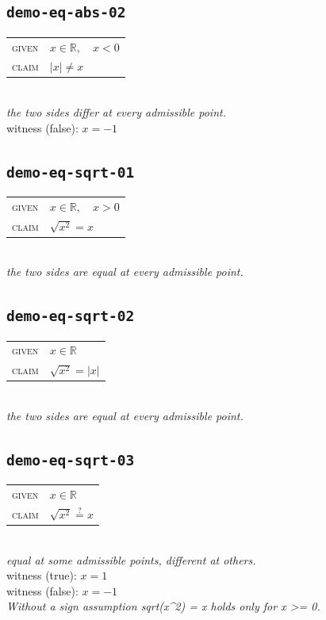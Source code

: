 \documentclass[11pt]{article}
\begin{document}
\subsection*{\texttt{demo-eq-abs-02}}
\begin{tabular}{@{}l@{\quad}l@{}}
\textsc{given} & $x \in \mathbb{R},\quad x < 0$ \\[4pt]
\textsc{claim} & $\displaystyle \left|x\right| \neq x$ \\
\end{tabular}\\[2pt]
{\small\emph{the two sides differ at every admissible point.}}\\
{\footnotesize\color{gray}witness (false): $x = -1$}\\

\subsection*{\texttt{demo-eq-sqrt-01}}
\begin{tabular}{@{}l@{\quad}l@{}}
\textsc{given} & $x \in \mathbb{R},\quad x > 0$ \\[4pt]
\textsc{claim} & $\displaystyle \sqrt{x^{2}} = x$ \\
\end{tabular}\\[2pt]
{\small\emph{the two sides are equal at every admissible point.}}\\

\subsection*{\texttt{demo-eq-sqrt-02}}
\begin{tabular}{@{}l@{\quad}l@{}}
\textsc{given} & $x \in \mathbb{R}$ \\[4pt]
\textsc{claim} & $\displaystyle \sqrt{x^{2}} = \left|x\right|$ \\
\end{tabular}\\[2pt]
{\small\emph{the two sides are equal at every admissible point.}}\\

\subsection*{\texttt{demo-eq-sqrt-03}}
\begin{tabular}{@{}l@{\quad}l@{}}
\textsc{given} & $x \in \mathbb{R}$ \\[4pt]
\textsc{claim} & $\displaystyle \sqrt{x^{2}} \overset{?}{=} x$ \\
\end{tabular}\\[2pt]
{\small\emph{equal at some admissible points, different at others.}}\\
{\footnotesize\color{gray}witness (true): $x = 1$}\\
{\footnotesize\color{gray}witness (false): $x = -1$}\\
\emph{Without a sign assumption sqrt(x\textasciicircum{}2) = x holds only for x >= 0.}\\
\end{document}

